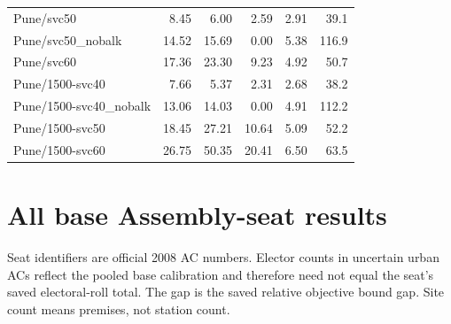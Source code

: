 \documentclass[11pt,a4paper,oneside]{report}
\begin{document}
\begin{center}
\begin{longtable}{p{5cm}rrrrr}
Pune/svc50 & 8.45 & 6.00 & 2.59 & 2.91 & 39.1\\
Pune/svc50\_nobalk & 14.52 & 15.69 & 0.00 & 5.38 & 116.9\\
Pune/svc60 & 17.36 & 23.30 & 9.23 & 4.92 & 50.7\\
Pune/1500-svc40 & 7.66 & 5.37 & 2.31 & 2.68 & 38.2\\
Pune/1500-svc40\_nobalk & 13.06 & 14.03 & 0.00 & 4.91 & 112.2\\
Pune/1500-svc50 & 18.45 & 27.21 & 10.64 & 5.09 & 52.2\\
Pune/1500-svc60 & 26.75 & 50.35 & 20.41 & 6.50 & 63.5\\
\end{longtable}
\end{center}

\chapter{All base Assembly-seat results}\label{app:acs}
Seat identifiers are official 2008 AC numbers. Elector counts in uncertain urban ACs reflect the pooled base calibration and therefore need not equal the seat's saved electoral-roll total. The gap is the saved relative objective bound gap. Site count means premises, not station count.
\end{document}
